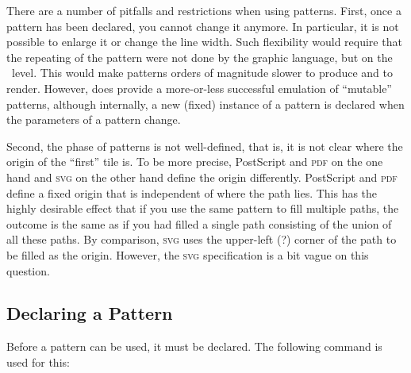 There are a number of pitfalls and restrictions when using
patterns. First, once a pattern has been declared, you cannot change
it anymore. In particular, it is not possible to enlarge it or change
the line width. Such flexibility would require that the repeating of
the pattern were not done by the graphic language, but on the
\pgfname\ level. This would make patterns orders of magnitude slower
to produce and to render. However, \pgfname{} does provide a
more-or-less successful emulation of ``mutable'' patterns, although
internally, a new (fixed) instance of a pattern is declared when
the parameters of a pattern change.

Second, the phase of patterns is not well-defined, that is, it is not
clear where the origin of the ``first'' tile is. To be more precise,
PostScript and \textsc{pdf} on the one hand and \textsc{svg} on the
other hand define the origin differently. PostScript and \textsc{pdf}
define a fixed origin that is independent of where the path lies. This
has the highly desirable effect that if you use the same pattern to
fill multiple paths, the outcome is the same as if you had filled a single path consisting of the union of all these paths. By
comparison, \textsc{svg} uses the upper-left (?) corner of the path to
be filled as the origin. However, the \textsc{svg} specification is a
bit vague on this question.


\subsection{Declaring a Pattern}

Before a pattern can be used, it must be declared. The following
command is used for this:

